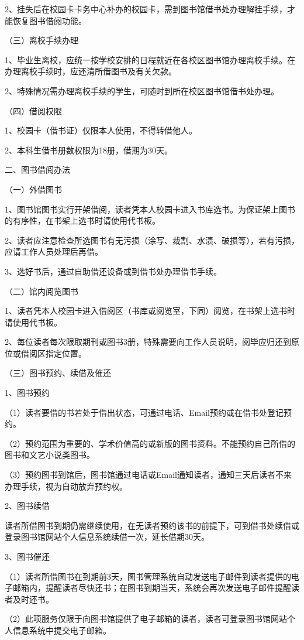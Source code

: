 \documentclass[UTF8,12pt,a4paper]{report}
\begin{document}
2、挂失后在校园卡卡务中心补办的校园卡，需到图书馆借书处办理解挂手续，才能恢复图书借阅功能。

（三）离校手续办理

1、毕业生离校，应统一按学校安排的日程就近在各校区图书馆办理离校手续。在办理离校手续时，应还清所借图书及有关欠款。

2、特殊情况需办理离校手续的学生，可随时到所在校区图书馆借书处办理。

（四）借阅权限

1、校园卡（借书证）仅限本人使用，不得转借他人。

2、本科生借书册数权限为18册，借期为30天。

二、图书借阅办法

（一）外借图书

1、图书馆图书实行开架借阅，读者凭本人校园卡进入书库选书。为保证架上图书的有序性，在书架上选书时请使用代书板。

2、读者应注意检查所选图书有无污损（涂写、裁割、水渍、破损等），若有污损，应请工作人员处理后再借。

3、选好书后，通过自助借还设备或到借书处办理借书手续。

（二）馆内阅览图书

1、读者凭本人校园卡进入借阅区（书库或阅览室，下同）阅览，在书架上选书时请使用代书板。

2、每位读者每次限取期刊或图书3册，特殊需要向工作人员说明，阅毕应归还到原位或借阅区指定位置。

（三）图书预约、续借及催还

1、图书预约

（1）读者要借的书若处于借出状态，可通过电话、Email预约或在借书处登记预约。

（2）预约范围为重要的、学术价值高的或新版的图书资料。不能预约自己所借的图书和文艺小说类图书。

（3）预约图书到馆后，图书馆通过电话或Email通知读者，通知三天后读者不来办理手续，视为自动放弃预约权。

2、图书续借

读者所借图书到期仍需继续使用，在无读者预约该书的前提下，可到借书处续借或登录图书馆网站个人信息系统续借一次，延长借期30天。

3、图书催还

（1）读者所借图书在到期前3天，图书管理系统自动发送电子邮件到读者提供的电子邮箱内，提醒读者尽快还书；在图书到期当天，系统会再次发送电子邮件提醒读者及时还书。

（2）此项服务仅限于向图书馆提供了电子邮箱的读者，读者可登录图书馆网站个人信息系统中提交电子邮箱。
\end{document}
